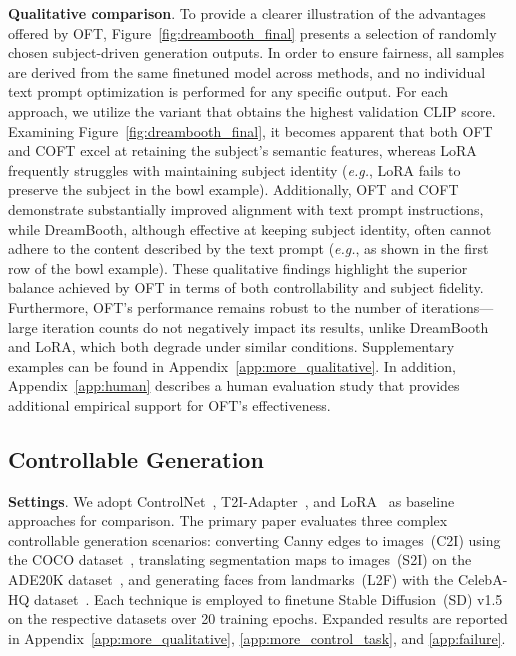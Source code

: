 \textbf{Qualitative comparison}. To provide a clearer illustration of the advantages offered by OFT, Figure~\ref{fig:dreambooth_final} presents a selection of randomly chosen subject-driven generation outputs. In order to ensure fairness, all samples are derived from the same finetuned model across methods, and no individual text prompt optimization is performed for any specific output. For each approach, we utilize the variant that obtains the highest validation CLIP score. Examining Figure~\ref{fig:dreambooth_final}, it becomes apparent that both OFT and COFT excel at retaining the subject's semantic features, whereas LoRA frequently struggles with maintaining subject identity (\emph{e.g.}, LoRA fails to preserve the subject in the bowl example). Additionally, OFT and COFT demonstrate substantially improved alignment with text prompt instructions, while DreamBooth, although effective at keeping subject identity, often cannot adhere to the content described by the text prompt (\emph{e.g.}, as shown in the first row of the bowl example). These qualitative findings highlight the superior balance achieved by OFT in terms of both controllability and subject fidelity. Furthermore, OFT's performance remains robust to the number of iterations—large iteration counts do not negatively impact its results, unlike DreamBooth and LoRA, which both degrade under similar conditions. Supplementary examples can be found in Appendix~\ref{app:more_qualitative}. In addition, Appendix~\ref{app:human} describes a human evaluation study that provides additional empirical support for OFT's effectiveness.

\subsection{Controllable Generation}

\textbf{Settings}. We adopt ControlNet~\cite{zhang2023adding}, T2I-Adapter~\cite{mou2023t2i}, and LoRA~\cite{hulora2022} as baseline approaches for comparison. The primary paper evaluates three complex controllable generation scenarios: converting Canny edges to images~(C2I) using the COCO dataset~\cite{lin2014microsoft}, translating segmentation maps to images~(S2I) on the ADE20K dataset~\cite{zhou2017scene}, and generating faces from landmarks~(L2F) with the CelebA-HQ dataset~\cite{karras2018progressive,xia2021tedigan}. Each technique is employed to finetune Stable Diffusion~(SD) v1.5 on the respective datasets over 20 training epochs. Expanded results are reported in Appendix~\ref{app:more_qualitative}, \ref{app:more_control_task}, and \ref{app:failure}.

